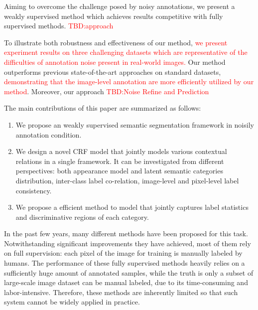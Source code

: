 Aiming to overcome the challenge posed by noisy annotations, we present a weakly supervised method which achieves results competitive with fully supervised methods. {\textcolor{red}{TBD:approach}}

To illustrate both robustness and effectiveness of our method, {\textcolor{red}{we present experiment results on three challenging datasets which are representative of the difficulties of annotation noise present in real-world images.}} Our method outperforms previous state-of-the-art approaches on standard datasets, {\textcolor{red}{demonstrating that the image-level annotation are more efficiently utilized by our method}}. Moreover, our approach {\textcolor{red}{TBD:Noise Refine and Prediction}}

The main contributions of this paper are summarized as follows:
\begin{enumerate}
  \item We propose an weakly supervised semantic segmentation framework in noisily annotation condition.
  \item We design a novel CRF model that jointly models various contextual relations in a single framework. It can be investigated from different perspectives: both appearance model and latent semantic categories distribution, inter-class label co-relation, image-level and pixel-level label consistency.
  \item We propose a efficient method to model that jointly captures label statistics and discriminative regions of each category.
\end{enumerate}

\if
In the past few years, many different methods \cite{csurka2011efficient,gonfaus2010harmony,ladicky2009associative,nowozin2010parameter,shotton2008semantic,shotton2006textonboost,singh2013nonparametric,verbeek2007scene,yang2007multiple,yao2012describing} have been proposed for this task. Notwithstanding significant improvements they have achieved, most of them rely on full supervision: each pixel of the image for training is manually labeled by humans. The performance of these fully supervised methods heavily relies on a sufficiently huge amount of annotated samples, while the truth is only a subset of large-scale image dataset can be manual labeled, due to its time-consuming and labor-intensive. Therefore, these methods are inherently limited so that such system cannot be widely applied in practice.


